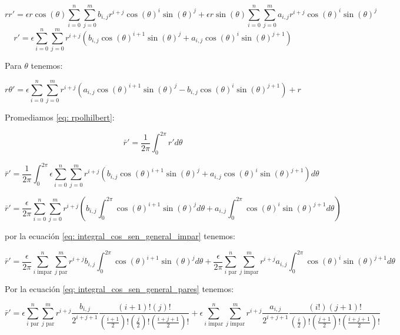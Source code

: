 \[
 rr'=\epsilon r\cos(\theta)\sum_{i=0}^{n}\sum_{j=0}^{m}b_{i,j}r^{i+j}\cos(\theta)^i\sin(\theta)^j + \epsilon r\sin(\theta)\sum_{i=0}^{n}\sum_{j=0}^{m}a_{i,j}r^{i+j}\cos(\theta)^i\sin(\theta)^j
\]
\begin{equation}\label{eq: rpolhilbert}
 r'=\epsilon\sum_{i=0}^{n}\sum_{j=0}^{m}r^{i+j}(b_{i,j}\cos(\theta)^{i+1}\sin(\theta)^j+a_{i,j}\cos(\theta)^i\sin(\theta)^{j+1})
\end{equation}

Para $\theta$ tenemos:

\begin{equation}\label{eq: thetapolhilbert}
	r\theta'=\epsilon\sum_{i=0}^{n}\sum_{j=0}^{m}r^{i+j}(a_{i,j}\cos(\theta)^{i+1}\sin(\theta)^j-b_{i,j}\cos(\theta)^{i}\sin(\theta)^{j+1})+r
\end{equation}

Promediamos \eqref{eq: rpolhilbert}:

\[
\bar{r}'=\frac{1}{2\pi}\int_{0}^{2\pi}r'd\theta
\]

\[
\bar{r}'=\frac{1}{2\pi}\int_{0}^{2\pi}\epsilon\sum_{i=0}^{n}\sum_{j=0}^{m}r^{i+j}(b_{i,j}\cos(\theta)^{i+1}\sin(\theta)^j+a_{i,j}\cos(\theta)^i\sin(\theta)^{j+1})d\theta
\]

\[
\bar{r}'=\frac{\epsilon}{2\pi}\sum_{i=0}^{n}\sum_{j=0}^{m}r^{i+j}\left(b_{i,j}\int_{0}^{2\pi}\cos(\theta)^{i+1}\sin(\theta)^j d\theta+a_{i,j}\int_{0}^{2\pi}\cos(\theta)^i\sin(\theta)^{j+1} d\theta\right)
\]

por la ecuación \eqref{eq: integral_cos_sen_general_impar} tenemos:

\[
\bar{r}'=\frac{\epsilon}{2\pi}\sum_{i \text{ impar}}^{n}\sum_{j \text{ par}}^{m}r^{i+j}b_{i,j}\int_{0}^{2\pi}\cos(\theta)^{i+1}\sin(\theta)^j d\theta+\frac{\epsilon}{2\pi}\sum_{i \text{ par}}^{n}\sum_{j \text{ impar}}^{m}r^{i+j}a_{i,j}\int_{0}^{2\pi}\cos(\theta)^i\sin(\theta)^{j+1} d\theta
\]

Por la ecuación \eqref{eq: integral_cos_sen_general_pares} tenemos:

\begin{equation}\label{r_promedio}
	\bar{r}'=\epsilon\sum_{i \text{ par}}^{n}\sum_{j \text{ par}}^{m}r^{i+j}\frac{b_{i,j}}{2^{i+j+1}}\frac{\left(i+1\right)!\left(j\right)!}{\left(\frac{i+1}{2}\right)!\left(\frac{j}{2}\right)!\left(\frac{i+j+1}{2}\right)!}+\epsilon\sum_{i \text{ impar}}^{n}\sum_{j \text{ impar}}^{m}r^{i+j}\frac{a_{i,j}}{2^{i+j+1}}\frac{\left(i!\right)\left(j+1\right)!}{\left(\frac{i}{2}\right)!\left(\frac{j+1}{2}\right)!\left(\frac{i+j+1}{2}\right)!}
\end{equation}

